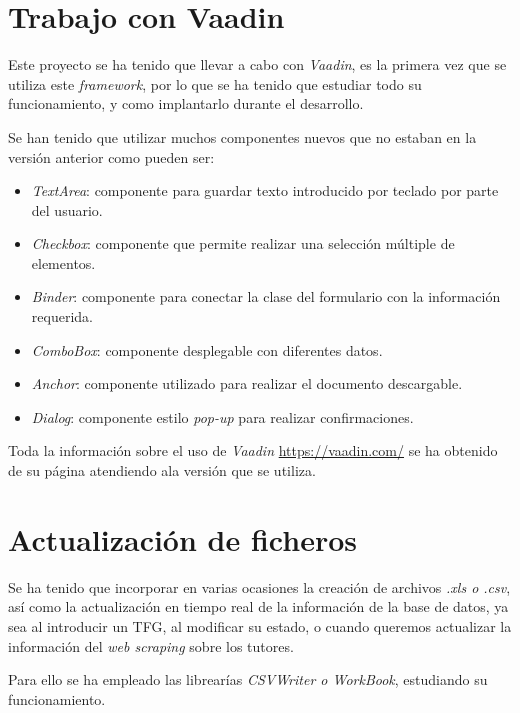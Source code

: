 \section{Trabajo con Vaadin}

Este proyecto se ha tenido que llevar a cabo con \emph{Vaadin}, es la primera vez que se utiliza este \emph{framework}, por lo que se ha tenido que estudiar todo su funcionamiento, y como implantarlo durante el desarrollo.

Se han tenido que utilizar muchos componentes nuevos que no estaban en la versión anterior como pueden ser:

\begin{itemize}
	\item \emph{TextArea}: componente para guardar texto introducido por teclado por parte del usuario.
	\item \emph{Checkbox}: componente que permite realizar una selección múltiple de elementos.
	\item \emph{Binder}: componente para conectar la clase del formulario con la información requerida.
	\item \emph{ComboBox}: componente desplegable con diferentes datos.
	\item \emph{Anchor}: componente utilizado para realizar el documento descargable.
	\item \emph{Dialog}: componente estilo \emph{pop-up} para realizar confirmaciones.

\end{itemize}

Toda la información sobre el uso de \emph{Vaadin} \url{https://vaadin.com/} se ha obtenido de su página atendiendo ala versión que se utiliza.

\section{Actualización de ficheros}

Se ha tenido que incorporar en varias ocasiones la creación de archivos \emph{.xls o .csv}, así como la actualización en tiempo real de la información de la base de datos, ya sea al introducir un TFG, al modificar su estado, o cuando queremos actualizar la información del \emph{web scraping} sobre los tutores.

Para ello se ha empleado las librearías \emph{CSVWriter o WorkBook}, estudiando su funcionamiento.
